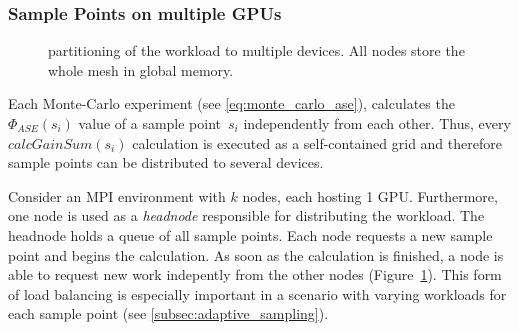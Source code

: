 \subsubsection{Sample Points on multiple GPUs}
\label{subsubsec:multigpu}
\begin{figure}[H]
  \centerline
  {}
  \caption{partitioning of the workload to multiple devices. All nodes store the whole mesh in
  global memory.}
  \label{graphic:multigpu}
\end{figure}
Each Monte-Carlo experiment (see \cref{eq:monte_carlo_ase}), calculates
the $\Phi_{ASE}(s_i)$ value of a sample point~$s_i$ independently from each
other. Thus, every $calcGainSum(s_i)$ calculation is executed as a
self-contained grid and therefore sample points can be distributed to
several devices.

Consider an MPI\cite{MPI} environment with $k$ nodes, each hosting 1 GPU\@. Furthermore, one
node is used as a \emph{headnode} responsible for distributing the workload. The
headnode holds a queue of all sample points. Each node requests a new sample
point and begins the calculation. As soon as the calculation is finished, a node
is able to request new work indepently from the other nodes (Figure~\ref{graphic:multigpu}). This form of load balancing is especially important in a
scenario with varying workloads for each sample point (see
\cref{subsec:adaptive_sampling}).

